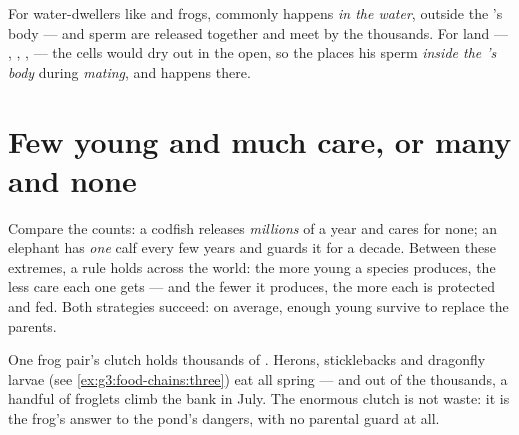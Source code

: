 \begin{proposition}\label{prop:g4:animal-reproduction:where}
For water-dwellers like  and frogs,  commonly
happens \emph{in the water}, outside the 's body ---
 and sperm are released together and meet by the
thousands. For land  --- , , ,
 --- the cells would dry out in the open, so the 
places his sperm \emph{inside the 's body} during
\emph{mating}, and  happens there.
\end{proposition}
\admitted

\section{Few young and much care, or many and none}

\begin{proposition}\label{prop:g4:animal-reproduction:strategies}
Compare the counts: a codfish releases \emph{millions} of 
a year and cares for none; an elephant has \emph{one} calf
every few years and guards it for a decade. Between these
extremes, a rule holds across the  world: the more young
a species produces, the less care each one gets --- and the
fewer it produces, the more each is protected and fed. Both
strategies succeed: on average, enough young survive to
replace the parents.
\end{proposition}
\admitted

\begin{example}\label{ex:g4:animal-reproduction:pondcount}
One frog pair's clutch holds thousands of . Herons,
sticklebacks and dragonfly larvae (see
\cref{ex:g3:food-chains:three}) eat  all spring ---
and out of the thousands, a handful of froglets climb the bank
in July. The enormous clutch is not waste: it is the frog's
answer to the pond's dangers, with no parental guard at all.
\end{example}

